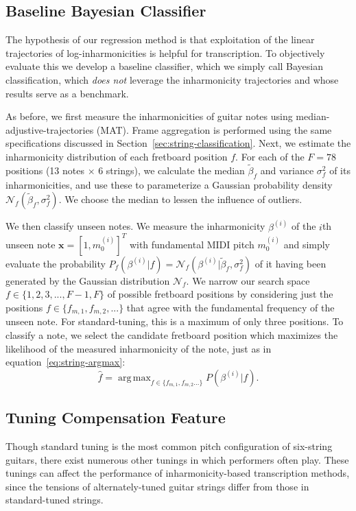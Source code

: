 \documentclass[convention,peer-reviewed]{aesconf}
\DeclareMathOperator*{\argmax}{arg\,max}
\begin{document}
\subsection{Baseline Bayesian Classifier}
The hypothesis of our regression method is that exploitation of the linear trajectories of log-inharmonicities is helpful for transcription. To objectively evaluate this we develop a baseline classifier, which we simply call Bayesian classification, which \textit{does not} leverage the inharmonicity trajectories and whose results serve as a benchmark.

As before, we first measure the inharmonicities of guitar notes using median-adjustive-trajectories (MAT). Frame aggregation is performed using the same specifications discussed in Section~\ref{sec:string-classification}. Next, we estimate the inharmonicity distribution of each fretboard position $f$. For each of the $F=78$ positions (13 notes $\times$ 6 strings), we calculate the median $\tilde{\beta}_f$ and variance $\sigma^2_f$ of its inharmonicities, and use these to parameterize a Gaussian probability density $\mathcal{N}_f(\tilde{\beta}_f,\sigma^2_f)$. We choose the median to lessen the influence of outliers.

We then classify unseen notes. We measure the inharmonicity $\beta^{(i)}$ of the $i$th unseen note $\mathbf{x}=[1,m_0^{(i)}]^T$ with fundamental MIDI pitch $m_0^{(i)}$ and simply evaluate the probability $P_f(\beta^{(i)} | f) = \mathcal{N}_f(\beta^{(i)} | \tilde{\beta}_f,\sigma^2_f)$ of it having been generated by the Gaussian distribution $\mathcal{N}_f$. We narrow our search space $f \in \{1,2,3,...,F-1,F\}$ of possible fretboard positions by considering just the positions $f \in \{f_{m,1},f_{m,2},...\}$ that agree with the fundamental frequency of the unseen note. For standard-tuning, this is a maximum of only three positions. To classify a note, we select the candidate fretboard position which maximizes the likelihood of the measured inharmonicity of the note, just as in equation~\eqref{eq:string-argmax}:
\begin{equation}
\hat{f} = \argmax_{f\in\{f_{m,1},f_{m,2}...\}}P(\beta^{(i)} | f).
\label{eq:string-classification-mle}
\end{equation}


\subsection{Tuning Compensation Feature}
Though standard tuning is the most common pitch configuration of six-string guitars, there exist numerous other tunings in which performers often play. These tunings can affect the performance of inharmonicity-based transcription methods, since the tensions of alternately-tuned guitar strings differ from those in standard-tuned strings.
\end{document}
